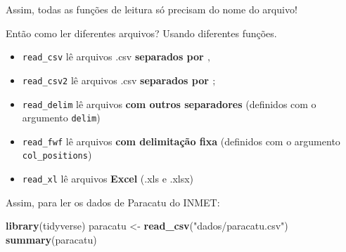 \documentclass[]{book}
\newenvironment{Shaded}{\begin{snugshade}}{\end{snugshade}}
\newcommand{\KeywordTok}[1]{\textcolor[rgb]{0.13,0.29,0.53}{\textbf{#1}}}
\newcommand{\StringTok}[1]{\textcolor[rgb]{0.31,0.60,0.02}{#1}}
\newcommand{\NormalTok}[1]{#1}
\providecommand{\tightlist}{%
  \setlength{\itemsep}{0pt}\setlength{\parskip}{0pt}}
\theoremstyle{definition}
\theoremstyle{definition}
\theoremstyle{definition}
\theoremstyle{remark}
\begin{document}
Assim, todas as funções de leitura só precisam do nome do arquivo!

Então como ler diferentes arquivos? Usando diferentes funções.

\begin{itemize}
\tightlist
\item
  \texttt{read\_csv} lê arquivos .csv \textbf{separados por \(,\)}\\
\item
  \texttt{read\_csv2} lê arquivos .csv \textbf{separados por \(;\)}\\
\item
  \texttt{read\_delim} lê arquivos \textbf{com outros separadores}
  (definidos com o argumento \texttt{delim})\\
\item
  \texttt{read\_fwf} lê arquivos \textbf{com delimitação fixa}
  (definidos com o argumento \texttt{col\_positions})\\
\item
  \texttt{read\_xl} lê arquivos \textbf{Excel} (.xls e .xlsx)
\end{itemize}

Assim, para ler os dados de Paracatu do INMET:

\begin{Shaded}
\begin{Highlighting}[]
\KeywordTok{library}\NormalTok{(tidyverse)}
\NormalTok{paracatu <-}\StringTok{ }\KeywordTok{read_csv}\NormalTok{(}\StringTok{"dados/paracatu.csv"}\NormalTok{)}
\KeywordTok{summary}\NormalTok{(paracatu)}
\end{Highlighting}
\end{Shaded}
\end{document}
